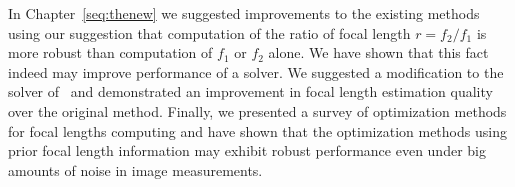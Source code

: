 In Chapter~\ref{seq:thenew} we suggested improvements to the existing methods using our suggestion that computation of the ratio of focal length $r= f_2 \slash f_1$ is more robust than computation of $f_1$ or $f_2$ alone. We have shown that this fact indeed may improve performance of a solver. We suggested a modification to the solver of~\cite{HartleyPriors} and demonstrated an improvement in focal length estimation quality over the original method. Finally, we presented a survey of optimization methods for focal lengths computing and have shown that the optimization methods using prior focal length information may exhibit robust performance even under big amounts of noise in image measurements.